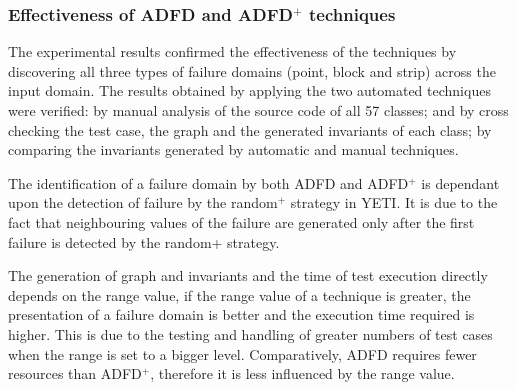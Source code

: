 






\subsubsection{Effectiveness of ADFD and ADFD$^+$ techniques}
The experimental results confirmed the effectiveness of the techniques by discovering all three types of failure domains (point, block and strip) across the input domain. The results obtained by applying the two automated techniques were verified: by manual analysis of the source code of all 57 classes; and by cross checking the test case, the graph and the generated invariants of each class; by comparing the invariants generated by automatic and manual techniques. 

The identification of a failure domain by both ADFD and ADFD$^+$ is dependant upon the detection of failure by the random$^+$ strategy in YETI. It is due to the fact that neighbouring values of the failure are generated only after the first failure is detected by the random+ strategy.

The generation of graph and invariants and the time of test execution directly depends on the range value, if the range value of a technique is greater, the presentation of a failure domain is better and the execution time required is higher. This is due to the testing and handling of greater numbers of test cases when the range is set to a bigger level. Comparatively, ADFD requires fewer resources than ADFD$^+$, therefore it is less influenced by the range value.

